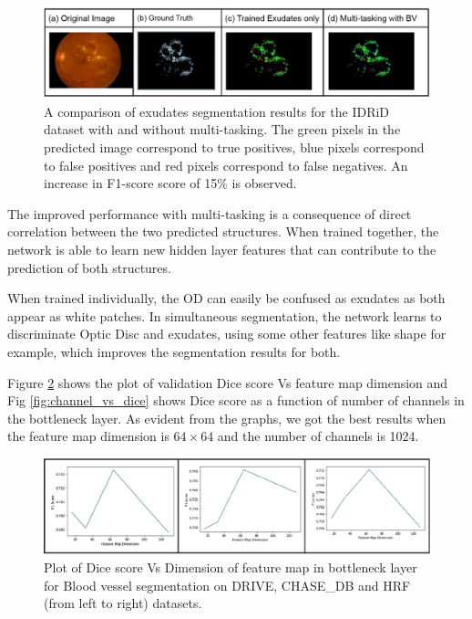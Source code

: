 \documentclass[utf8]{FrontiersinHarvard} %
\begin{document}
\begin{figure}[h!]
\begin{center}
\includegraphics[width=15cm]{images/exudates_results.jpg}%
\end{center}
\caption{A comparison of exudates segmentation results for the IDRiD dataset with and without multi-tasking. The green pixels in the predicted image correspond to true positives, blue pixels correspond to false positives and  red pixels correspond to false negatives. An increase in F1-score score of 15\% is observed.}
\label{fig:exudates_segmentation_results}
\end{figure}

The improved performance with multi-tasking is a consequence of direct correlation between the two predicted structures. When trained together, the network is able to learn new hidden layer features that can contribute to the prediction of both structures.

When trained individually, the OD can easily be confused as exudates as both appear as white patches. In simultaneous segmentation, the network learns to discriminate Optic Disc and exudates, using some other features like shape for example, which improves the segmentation results for both.


Figure \ref{fig:zdim_vs_dice} shows the plot of validation Dice score Vs feature map dimension and Fig \ref{fig:channel_vs_dice}  shows Dice score as a function of  number of channels in the bottleneck layer. As evident from the graphs, we got the best results when the feature map dimension is $64\times64$ and the number of channels is 1024.

\begin{figure}[h!]
\begin{center}
\includegraphics[width=15cm]{images/zdim_vs_dice.jpg}%
\end{center}
\caption{Plot of Dice score Vs Dimension of feature map in bottleneck layer for Blood vessel segmentation on DRIVE, CHASE\_DB and HRF (from left to right) datasets.}
\label{fig:zdim_vs_dice}
\end{figure}
\end{document}
